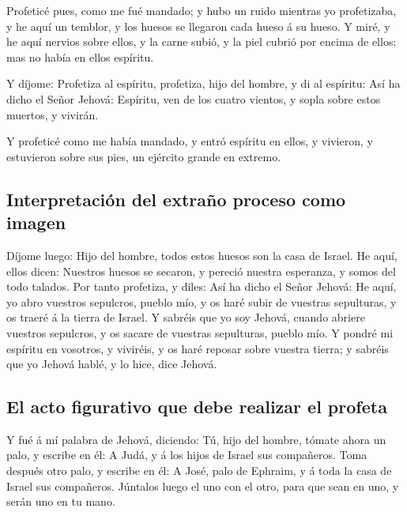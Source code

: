  Profeticé pues, como me fué mandado; y hubo un ruido
mientras yo profetizaba, y he aquí un temblor, y los huesos se llegaron
cada hueso á su hueso.  Y miré, y he aquí nervios sobre
ellos, y la carne subió, y la piel cubrió por encima de ellos: mas no
había en ellos espíritu.

 Y díjome: Profetiza al espíritu, profetiza, hijo del
hombre, y di al espíritu: Así ha dicho el Señor Jehová: Espíritu, ven de
los cuatro vientos, y sopla sobre estos muertos, y vivirán.

 Y profeticé como me había mandado, y entró espíritu en
ellos, y vivieron, y estuvieron sobre sus pies, un ejército grande en
extremo.

\hypertarget{interpretaciuxf3n-del-extrauxf1o-proceso-como-imagen}{%
\subsection{Interpretación del extraño proceso como
imagen}\label{interpretaciuxf3n-del-extrauxf1o-proceso-como-imagen}}

 Díjome luego: Hijo del hombre, todos estos huesos son la
casa de Israel. He aquí, ellos dicen: Nuestros huesos se secaron, y
pereció nuestra esperanza, y somos del todo talados.  Por
tanto profetiza, y diles: Así ha dicho el Señor Jehová: He aquí, yo abro
vuestros sepulcros, pueblo mío, y os haré subir de vuestras sepulturas,
y os traeré á la tierra de Israel.  Y sabréis que yo soy
Jehová, cuando abriere vuestros sepulcros, y os sacare de vuestras
sepulturas, pueblo mío.  Y pondré mi espíritu en
vosotros, y viviréis, y os haré reposar sobre vuestra tierra; y sabréis
que yo Jehová hablé, y lo hice, dice Jehová.

\hypertarget{el-acto-figurativo-que-debe-realizar-el-profeta}{%
\subsection{El acto figurativo que debe realizar el
profeta}\label{el-acto-figurativo-que-debe-realizar-el-profeta}}

 Y fué á mí palabra de Jehová, diciendo: 
Tú, hijo del hombre, tómate ahora un palo, y escribe en él: A Judá, y á
los hijos de Israel sus compañeros. Toma después otro palo, y escribe en
él: A José, palo de Ephraim, y á toda la casa de Israel sus compañeros.
 Júntalos luego el uno con el otro, para que sean en uno,
y serán uno en tu mano.

